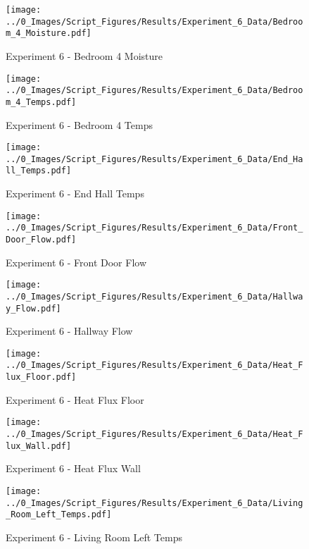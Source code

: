 	\begin{figure}[H]
		\centering
		\texttt{[image: ../0\_Images/Script\_Figures/Results/Experiment\_6\_Data/Bedroom\_4\_Moisture.pdf]}
		\caption[]{Experiment 6 - Bedroom 4 Moisture}
	\end{figure}
 
	\clearpage

	\begin{figure}[H]
		\centering
		\texttt{[image: ../0\_Images/Script\_Figures/Results/Experiment\_6\_Data/Bedroom\_4\_Temps.pdf]}
		\caption[]{Experiment 6 - Bedroom 4 Temps}
	\end{figure}
 

	\begin{figure}[H]
		\centering
		\texttt{[image: ../0\_Images/Script\_Figures/Results/Experiment\_6\_Data/End\_Hall\_Temps.pdf]}
		\caption[]{Experiment 6 - End Hall Temps}
	\end{figure}
 
	\clearpage

	\begin{figure}[H]
		\centering
		\texttt{[image: ../0\_Images/Script\_Figures/Results/Experiment\_6\_Data/Front\_Door\_Flow.pdf]}
		\caption[]{Experiment 6 - Front Door Flow}
	\end{figure}
 

	\begin{figure}[H]
		\centering
		\texttt{[image: ../0\_Images/Script\_Figures/Results/Experiment\_6\_Data/Hallway\_Flow.pdf]}
		\caption[]{Experiment 6 - Hallway Flow}
	\end{figure}
 
	\clearpage

	\begin{figure}[H]
		\centering
		\texttt{[image: ../0\_Images/Script\_Figures/Results/Experiment\_6\_Data/Heat\_Flux\_Floor.pdf]}
		\caption[]{Experiment 6 - Heat Flux Floor}
	\end{figure}
 

	\begin{figure}[H]
		\centering
		\texttt{[image: ../0\_Images/Script\_Figures/Results/Experiment\_6\_Data/Heat\_Flux\_Wall.pdf]}
		\caption[]{Experiment 6 - Heat Flux Wall}
	\end{figure}
 
	\clearpage

	\begin{figure}[H]
		\centering
		\texttt{[image: ../0\_Images/Script\_Figures/Results/Experiment\_6\_Data/Living\_Room\_Left\_Temps.pdf]}
		\caption[]{Experiment 6 - Living Room Left Temps}
	\end{figure}
 

